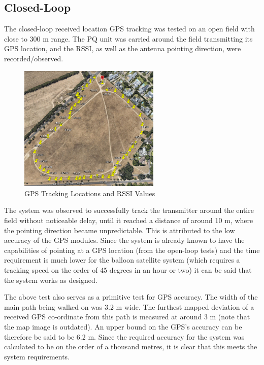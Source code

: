 \subsection{Closed-Loop}

The closed-loop received location GPS tracking was tested on an open field with close to 300 m range. The PQ unit was carried around the field transmitting its GPS location, and the RSSI, as well as the antenna pointing direction, were recorded/observed.

\begin{figure}[!htb]
  \centering
  \includegraphics[width=0.6\textwidth]{gpsTrackingMap}
  \caption{GPS Tracking Locations and RSSI Values}
  \label{fig:gpsTrackingMap}
\end{figure}

The system was observed to successfully track the transmitter around the entire field without noticeable delay, until it reached a distance of around 10 m, where the pointing direction became unpredictable. This is attributed to the low accuracy of the GPS modules. Since the system is already known to have the capabilities of pointing at a GPS location (from the open-loop tests) and the time requirement is much lower for the balloon satellite system (which requires a tracking speed on the order of 45 degrees in an hour or two) it can be said that the system works as designed.

The above test also serves as a primitive test for GPS accuracy. The width of the main path being walked on was 3.2 m wide. The furthest mapped deviation of a received GPS co-ordinate from this path is measured at around 3 m (note that the map image is outdated). An upper bound on the GPS's accuracy can be therefore be said to be 6.2 m. Since the required accuracy for the system was calculated to be on the order of a thousand metres, it is clear that this meets the system requirements.